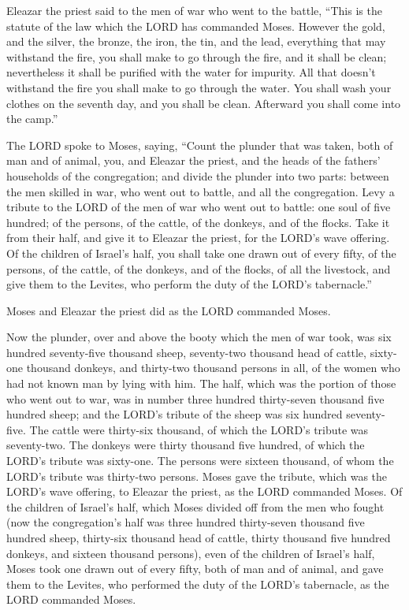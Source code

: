 \myverse{}Eleazar the priest said to the men of war who went to the battle,
“This is the statute of the law which the LORD has commanded Moses.
\myverse{}However the gold, and the silver, the bronze, the iron, the tin, and the
lead,
\myverse{}everything that may withstand the fire, you shall make to go through the
fire, and it shall be clean; nevertheless it shall be purified with the water for impurity. All that doesn’t
withstand the fire you shall make to go through the water.
\myverse{}You shall wash your clothes on the seventh day, and you shall be clean. Afterward
you shall come into the camp.”


\myverse{}The LORD spoke to Moses, saying,
\myverse{}“Count the plunder that was taken, both of man and of animal, you, and Eleazar
the priest, and the heads of the fathers’ households of the congregation;
\myverse{}and divide the plunder into two parts: between the men skilled in war, who
went out to battle, and all the congregation.
\myverse{}Levy a tribute to the LORD of the men of war who went out to battle: one
soul of five hundred; of the persons, of the cattle, of the donkeys, and of the flocks.
\myverse{}Take it from their half, and give it to Eleazar the priest, for the LORD’s
wave offering.
\myverse{}Of the children of Israel’s half, you shall take one drawn out of every fifty,
of the persons, of the cattle, of the donkeys, and of the flocks, of all the livestock, and give them
to the Levites, who perform the duty of the LORD’s tabernacle.”


\myverse{}Moses and Eleazar the priest did as the LORD commanded Moses.


\myverse{}Now the plunder, over and above the booty which the men of war
took, was six hundred seventy-five thousand sheep,
\myverse{}seventy-two thousand head of cattle,
\myverse{}sixty-one thousand donkeys,
\myverse{}and thirty-two thousand persons in all, of the women who had not known man
by lying with him.
\myverse{}The half, which was the portion of those who went out to war, was in number
three hundred thirty-seven thousand five hundred sheep;
\myverse{}and the LORD’s tribute of the sheep was six hundred seventy-five.
\myverse{}The cattle were thirty-six thousand, of which the LORD’s tribute was seventy-two.
\myverse{}The donkeys were thirty thousand five hundred, of which the LORD’s tribute
was sixty-one.
\myverse{}The persons were sixteen thousand, of whom the LORD’s tribute was thirty-two
persons.
\myverse{}Moses gave the tribute, which was the LORD’s wave offering, to Eleazar the
priest, as the LORD commanded Moses.
\myverse{}Of the children of Israel’s half, which Moses divided off from the men who
fought
\myverse{}(now the congregation’s half was three hundred thirty-seven thousand five
hundred sheep,
\myverse{}thirty-six thousand head of cattle,
\myverse{}thirty thousand five hundred donkeys,
\myverse{}and sixteen thousand persons),
\myverse{}even of the children of Israel’s half, Moses took one drawn out of every
fifty, both of man and of animal, and gave them to the Levites, who performed the duty of the LORD’s tabernacle,
as the LORD commanded Moses.


